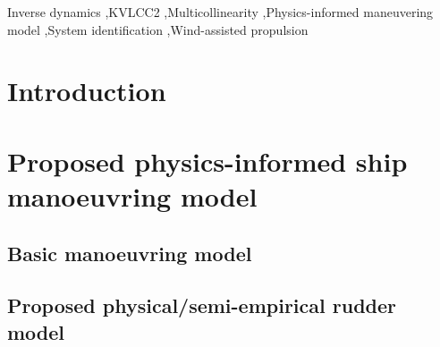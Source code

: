 \documentclass[preprint,12pt,authoryear]{elsarticle}
\begin{document}
\begin{frontmatter}

    \begin{abstract}
        

    \end{abstract}


    \begin{keyword}
    Inverse dynamics \sep KVLCC2 \sep Multicollinearity \sep Physics-informed maneuvering model \sep System identification \sep Wind-assisted propulsion 



    \end{keyword}

\end{frontmatter}
\section{Introduction}
\label{sec:introduction}

%
%
%
\section{Proposed physics-informed ship manoeuvring model}
\label{sec:ship_models}

\FloatBarrier
\subsection{Basic manoeuvring model}
\label{sec:models}

%
\subsection{Proposed physical/semi-empirical rudder model}
\label{sec:semiempirical_rudder_model}

%
\end{document}
